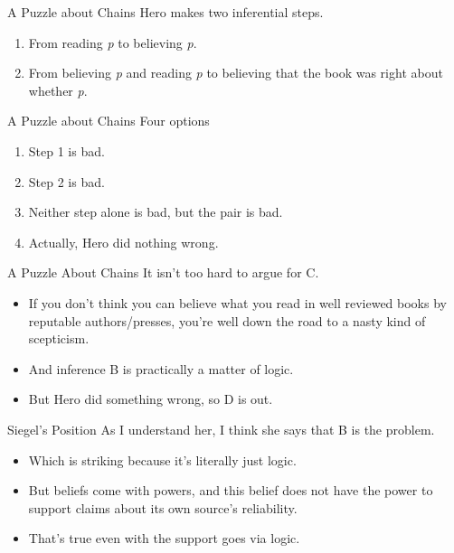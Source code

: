 \documentclass[
  17pt,
  letterpaper,
  ignorenonframetext,
  aspectratio=169,
  xcolor={dvipsnames}]{beamer}
\providecommand{\tightlist}{%
  \setlength{\itemsep}{0pt}\setlength{\parskip}{0pt}}\usepackage{longtable,booktabs,array}
\begin{document}
\begin{frame}{A Puzzle about Chains}
\protect\hypertarget{a-puzzle-about-chains}{}
Hero makes two inferential steps.

\begin{enumerate}[<+->]
\tightlist
\item
  From reading \emph{p} to believing \emph{p}.
\item
  From believing \emph{p} and reading \emph{p} to believing that the
  book was right about whether \emph{p}.
\end{enumerate}
\end{frame}

\begin{frame}{A Puzzle about Chains}
\protect\hypertarget{a-puzzle-about-chains-1}{}
Four options

\begin{enumerate}[<+->]
[A.]
\tightlist
\item
  Step 1 is bad.
\item
  Step 2 is bad.
\item
  Neither step alone is bad, but the pair is bad.
\item
  Actually, Hero did nothing wrong.
\end{enumerate}
\end{frame}

\begin{frame}{A Puzzle About Chains}
\protect\hypertarget{a-puzzle-about-chains-2}{}
It isn't too hard to argue for C.

\begin{itemize}[<+->]
\tightlist
\item
  If you don't think you can believe what you read in well reviewed
  books by reputable authors/presses, you're well down the road to a
  nasty kind of scepticism.
\item
  And inference B is practically a matter of logic.
\item
  But Hero did something wrong, so D is out.
\end{itemize}
\end{frame}

\begin{frame}{Siegel's Position}
\protect\hypertarget{siegels-position}{}
As I understand her, I think she says that B is the problem.

\begin{itemize}[<+->]
\tightlist
\item
  Which is striking because it's literally just logic.
\item
  But beliefs come with powers, and this belief does not have the power
  to support claims about its own source's reliability.
\item
  That's true even with the support goes via logic.
\end{itemize}
\end{frame}
\end{document}
